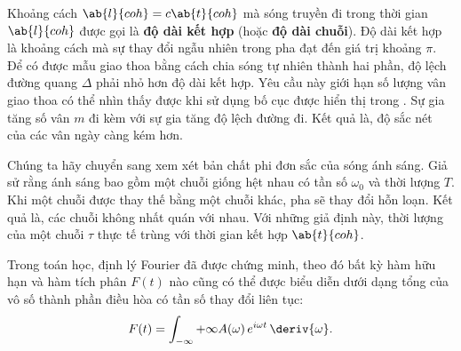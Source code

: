 Khoảng cách $\ab{l}{coh} = c\ab{t}{coh}$ mà sóng truyền đi trong thời gian $\ab{l}{coh}$ được gọi là \textbf{độ dài kết hợp} (hoặc \textbf{độ dài chuỗi}).
Độ dài kết hợp là khoảng cách mà sự thay đổi ngẫu nhiên trong pha đạt đến giá trị khoảng $\pi$.
Để có được mẫu giao thoa bằng cách chia sóng tự nhiên thành hai phần, độ lệch đường quang $\Delta$ phải nhỏ hơn độ dài kết hợp.
Yêu cầu này giới hạn số lượng vân giao thoa có thể nhìn thấy được khi sử dụng bố cục được hiển thị trong .
Sự gia tăng số vân $m$ đi kèm với sự gia tăng độ lệch đường đi.
Kết quả là, độ sắc nét của các vân ngày càng kém hơn.

Chúng ta hãy chuyển sang xem xét bản chất phi đơn sắc của sóng ánh sáng.
Giả sử rằng ánh sáng bao gồm một chuỗi giống hệt nhau có tần số $\omega_0$ và thời lượng $T$.
Khi một chuỗi được thay thế bằng một chuỗi khác, pha sẽ thay đổi hỗn loạn.
Kết quả là, các chuỗi không nhất quán với nhau.
Với những giả định này, thời lượng của một chuỗi $\tau$ thực tế trùng với thời gian kết hợp $\ab{t}{coh}$.

Trong toán học, định lý Fourier đã được chứng minh, theo đó bất kỳ hàm hữu hạn và hàm tích phân $F(t)$ nào cũng có thể được biểu diễn dưới dạng tổng của vô số thành phần điều hòa có tần số thay đổi liên tục:
\begin{equation}\label{eq:17_16}
    F(t) = \int_{-\infty}{+\infty} A(\omega) \, e^{i\omega t}\, \deriv{\omega}.
\end{equation}


